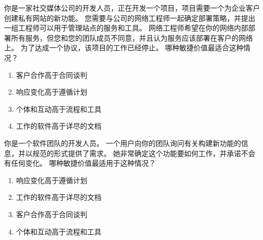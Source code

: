 \begin{problem}
	你是一家社交媒体公司的开发人员，正在开发一个项目，项目需要一个为企业客户创建私有网站的新功能。 您需要与公司的网络工程师一起确定部署策略，并提出一组工程师可以用于管理站点的服务和工具。 网络工程师希望在你的网络内部部署所有服务，但您和您的团队成员不同意，并且认为服务应该部署在客户的网络上。 为了达成一个协议，该项目的工作已经停止。 哪种敏捷价值最适合这种情况？
    \vspace{-0.8em}
    \begin{multicols}{2}
        \begin{enumerate}[label=\Alph*.]
            \item 客户合作高于合同谈判
            \item 响应变化高于遵循计划
            \item 个体和互动高于流程和工具
            \item 工作的软件高于详尽的文档
        \end{enumerate}
    \end{multicols}
    \vspace{-1em}
\end{problem}




\begin{problem}
	你是一个软件团队的开发人员。 一个用户向你的团队询问有关构建新功能的信息，并以规范的形式提供了需求。 她非常确定这个功能要如何工作，并承诺不会有任何变化。 哪种敏捷价值最适用于这种情况？
    \vspace{-0.8em}
    \begin{multicols}{2}
        \begin{enumerate}[label=\Alph*.]
            \item 响应变化高于遵循计划
            \item 工作的软件高于详尽的文档
            \item 客户合作高于合同谈判
            \item 个体和互动高于流程和工具
        \end{enumerate}
    \end{multicols}
    \vspace{-1em}
\end{problem}




